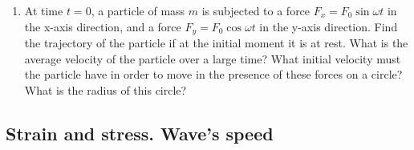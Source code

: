 \documentclass{article}
\begin{document}
\begin{enumerate}[label=3.5.\arabic*]
\item At time $t = 0$, a particle of mass $m$ is subjected to a force $F_x = F_0 \sin{\omega t}$ in the x-axis direction, and a force $F_y = F_0 \cos{\omega t}$ in the y-axis direction. Find the trajectory of the particle if at the initial moment it is at rest. What is the average velocity of the particle over a large time? What initial velocity must the particle have in order to move in the presence of these forces on a circle? What is the radius of this circle?





\end{enumerate}


\subsection{Strain and stress. Wave's speed}
\end{document}
